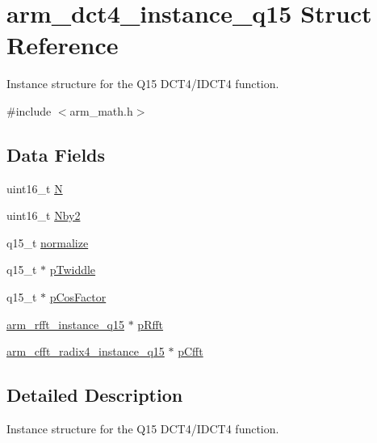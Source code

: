 \hypertarget{structarm__dct4__instance__q15}{\section{arm\-\_\-dct4\-\_\-instance\-\_\-q15 Struct Reference}
\label{structarm__dct4__instance__q15}
}


Instance structure for the Q15 D\-C\-T4/\-I\-D\-C\-T4 function.  




{\ttfamily \#include $<$arm\-\_\-math.\-h$>$}

\subsection*{Data Fields}
\begin{DoxyCompactItemize}
\item 
uint16\-\_\-t \hyperlink{structarm__dct4__instance__q15_a37d49571fe35012087153c093705cd11}{N}
\item 
uint16\-\_\-t \hyperlink{structarm__dct4__instance__q15_afa64b1618089e35c2b55cff71cb29715}{Nby2}
\item 
q15\-\_\-t \hyperlink{structarm__dct4__instance__q15_a8ba8c9fa75542dac82553fee982ccd3e}{normalize}
\item 
q15\-\_\-t $\ast$ \hyperlink{structarm__dct4__instance__q15_aa8c837c05b2c910342ab8f171d30dc02}{p\-Twiddle}
\item 
q15\-\_\-t $\ast$ \hyperlink{structarm__dct4__instance__q15_a9d858d313cbba67ceaef9704bc9c43b0}{p\-Cos\-Factor}
\item 
\hyperlink{structarm__rfft__instance__q15}{arm\-\_\-rfft\-\_\-instance\-\_\-q15} $\ast$ \hyperlink{structarm__dct4__instance__q15_aea6aa42c838f2b22c8c31e9e259b8d75}{p\-Rfft}
\item 
\hyperlink{structarm__cfft__radix4__instance__q15}{arm\-\_\-cfft\-\_\-radix4\-\_\-instance\-\_\-q15} $\ast$ \hyperlink{structarm__dct4__instance__q15_ae0ac7c3a89699793fc0dac960db7f056}{p\-Cfft}
\end{DoxyCompactItemize}


\subsection{Detailed Description}
Instance structure for the Q15 D\-C\-T4/\-I\-D\-C\-T4 function. 

